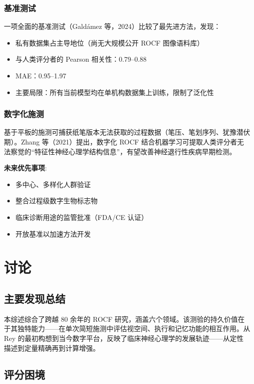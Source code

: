 \documentclass[12pt,a4paper]{ctexart}
\begin{document}
\subsubsection{基准测试}

一项全面的基准测试（Galdámez 等，2024）比较了最先进方法，发现：

\begin{itemize}
\item 私有数据集占主导地位（尚无大规模公开 ROCF 图像语料库）
\item 与人类评分者的 Pearson 相关性：0.79–0.88
\item MAE：0.95–1.97
\item 主要局限：所有当前模型均在单机构数据集上训练，限制了泛化性
\end{itemize}

\subsubsection{数字化施测}

基于平板的施测可捕获纸笔版本无法获取的过程数据（笔压、笔划序列、犹豫潜伏期）。Zhang 等（2021）提出，数字化 ROCF 结合机器学习可提取人类评分者无法察觉的``特征性神经心理学结构信息''，有望改善神经退行性疾病早期检测。

\textbf{未来优先事项}:

\begin{itemize}
\item 多中心、多样化人群验证
\item 整合过程级数字生物标志物
\item 临床诊断用途的监管批准（FDA/CE 认证）
\item 开放基准以加速方法开发
\end{itemize}

\section{讨论}

\subsection{主要发现总结}

本综述综合了跨越 80 余年的 ROCF 研究，涵盖六个领域。该测验的持久价值在于其独特能力——在单次简短施测中评估视空间、执行和记忆功能的相互作用。从 Rey 的最初构想到当今数字平台，反映了临床神经心理学的发展轨迹——从定性描述到定量精确再到计算增强。

\subsection{评分困境}
\end{document}

